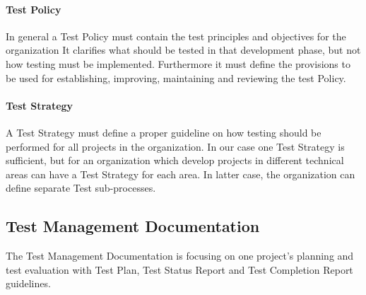 \paragraph{Test Policy}
In general a Test Policy must contain the test principles and objectives for the organization It clarifies what should be tested in that development phase, but not how testing must be implemented. Furthermore it must define the provisions to be used for establishing, improving, maintaining and reviewing the test Policy.

\paragraph{Test Strategy}
A Test Strategy must define a proper guideline on how testing should be performed for all projects in the organization. In our case one Test Strategy is sufficient, but for an organization which develop projects in different technical areas can have a Test Strategy for each area. In latter case, the organization can define separate Test sub-processes. 



\subsection{Test Management Documentation}
The Test Management Documentation is focusing on one project's planning and test evaluation with Test Plan, Test Status Report and Test Completion Report guidelines.

